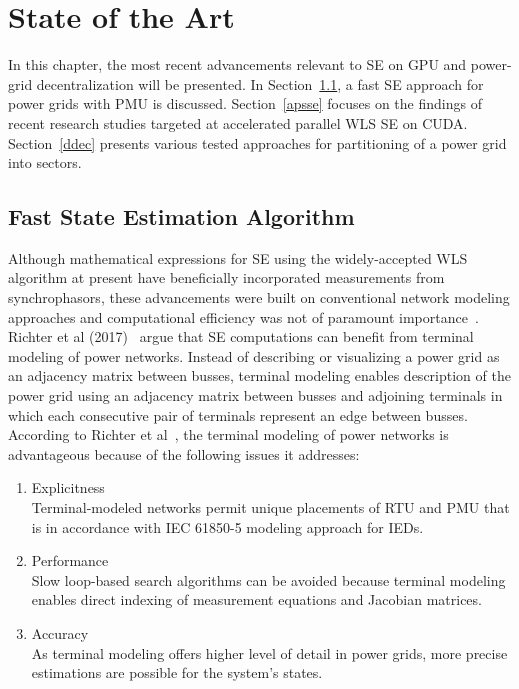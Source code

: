 \documentclass[thesis.tex]{subfiles}
\begin{document}
\chapter{State of the Art}\label{chap:prevwork}

In this chapter, the most recent advancements relevant to SE on GPU and power-grid decentralization will be presented. In Section~\ref{fsea}, a fast SE approach for power grids with PMU is discussed. Section~\ref{apsse} focuses on the findings of recent research studies targeted at accelerated parallel WLS SE on CUDA. Section~\ref{ddec} presents various tested approaches for partitioning of a power grid into sectors.


\section{Fast State Estimation Algorithm }\label{fsea}
Although mathematical expressions for SE using the widely-accepted WLS algorithm at present have beneficially incorporated measurements from synchrophasors, these advancements were built on conventional network modeling approaches and computational efficiency was not of paramount importance~\cite{Huang}\cite{Gomez}.\\
Richter et al (2017)~\cite{Richter}  argue that SE computations can benefit from terminal modeling of power networks. Instead of describing or visualizing a power grid as an adjacency matrix between busses, terminal modeling enables description of the power grid using an adjacency matrix between busses and adjoining terminals in which each consecutive pair of terminals represent an edge between busses. According to Richter et al~\cite{Richter}, the terminal modeling of power networks is advantageous because of the following issues it addresses:
\begin{enumerate}
	\item Explicitness\\Terminal-modeled networks permit unique placements of RTU and PMU that is in accordance with IEC 61850-5 modeling approach for IEDs.
	\item Performance \\Slow loop-based search algorithms can be avoided because terminal modeling enables direct indexing of measurement equations and Jacobian matrices.
	\item Accuracy \\As terminal modeling offers higher level of detail in power grids, more precise estimations are possible for the system’s states.
\end{enumerate}
\end{document}
